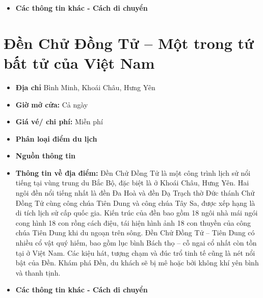 \documentclass{article}
\begin{document}
\begin{itemize}
    \item{\textbf{Các thông tin khác - Cách di chuyển}}
\end{itemize}

\section{Đền Chử Đồng Tử – Một trong tứ bất tử của Việt Nam}
\begin{itemize}
    \item{\textbf{Địa chỉ}} Bình Minh, Khoái Châu, Hưng Yên

    \item{\textbf{Giờ mở cửa:}} Cả ngày

    \item{\textbf{Giá vé/ chi phí:}} Miễn phí

    \item{\textbf{Phân loại điểm du lịch}}

    \item{\textbf{Nguồn thông tin}}

    \item{\textbf{Thông tin về địa điểm:}} Đền Chử Đồng Tử là một công trình lịch sử nổi tiếng tại vùng trung du Bắc Bộ, đặc biệt là ở Khoái Châu, Hưng Yên. Hai ngôi đền nổi tiếng nhất là đền Đa Hoà và đền Dạ Trạch thờ Đức thánh Chử Đồng Tử cùng công chúa Tiên Dung và công chúa Tây Sa, được xếp hạng là di tích lịch sử cấp quốc gia. Kiến trúc của đền bao gồm 18 ngôi nhà mái ngói cong hình 18 con rồng cách điệu, tái hiện hình ảnh 18 con thuyền của công chúa Tiên Dung khi du ngoạn trên sông. Đền Chử Đồng Tử – Tiên Dung có nhiều cổ vật quý hiếm, bao gồm lục bình Bách thọ – cỗ ngai cổ nhất còn tồn tại ở Việt Nam. Các kiệu hát, tượng chạm và đúc trổ tinh tế cũng là nét nổi bật của Đền. Khám phá Đền, du khách sẽ bị mê hoặc bởi không khí yên bình và thanh tịnh.

\end{itemize}

\begin{itemize}
    \item{\textbf{Các thông tin khác - Cách di chuyển}}
\end{itemize}
\end{document}

